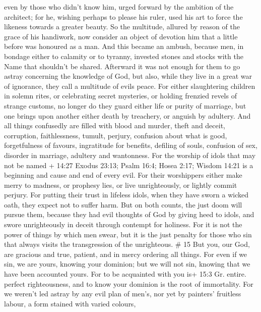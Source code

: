 even by those who didn't know him, urged forward by the ambition of the
architect;  for he, wishing perhaps to please his ruler,
used his art to force the likeness towards a greater beauty.
 So the multitude, allured by reason of the grace of his
handiwork, now consider an object of devotion him that a little before
was honoured as a man.  And this became an ambush, because
men, in bondage either to calamity or to tyranny, invested stones and
stocks with the Name that shouldn't be shared.  Afterward
it was not enough for them to go astray concerning the knowledge of God,
but also, while they live in a great war of ignorance, they call a
multitude of evils peace.  For either slaughtering children
in solemn rites, or celebrating secret mysteries, or holding frenzied
revels of strange customs,  no longer do they guard either
life or purity of marriage, but one brings upon another either death by
treachery, or anguish by adultery.  And all things
confusedly are filled with blood and murder, theft and deceit,
corruption, faithlessness, tumult, perjury,  confusion
about what is good, forgetfulness of favours, ingratitude for benefits,
defiling of souls, confusion of sex, disorder in marriage, adultery and
wantonness.  For the worship of idols that may not be named
+ 14:27 Exodus 23:13; Psalm 16:4; Hosea 2:17; Wisdom 14:21 is a
beginning and cause and end of every evil.  For their
worshippers either make merry to madness, or prophesy lies, or live
unrighteously, or lightly commit perjury.  For putting
their trust in lifeless idols, when they have sworn a wicked oath, they
expect not to suffer harm.  But on both counts, the just
doom will pursue them, because they had evil thoughts of God by giving
heed to idols, and swore unrighteously in deceit through contempt for
holiness.  For it is not the power of things by which men
swear, but it is the just penalty for those who sin that always visits
the transgression of the unrighteous. \# 15  But you, our
God, are gracious and true, patient, and in mercy ordering all things.
 For even if we sin, we are yours, knowing your dominion;
but we will not sin, knowing that we have been accounted yours.
 For to be acquainted with you is+ 15:3 Gr. entire. perfect
righteousness, and to know your dominion is the root of immortality.
 For we weren't led astray by any evil plan of men's, nor
yet by painters' fruitless labour, a form stained with varied colours,
